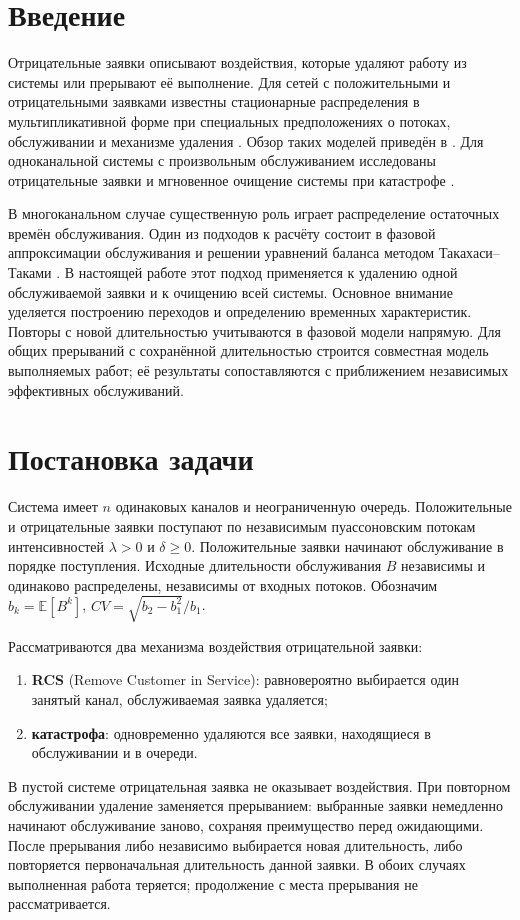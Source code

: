 \section{Введение}
Отрицательные заявки описывают воздействия, которые удаляют работу из системы или прерывают её выполнение. Для сетей с положительными и отрицательными заявками известны стационарные распределения в мультипликативной форме при специальных предположениях о потоках, обслуживании и механизме удаления \cite{gelenbe1991,gelenbe1992}. Обзор таких моделей приведён в \cite{artalejo2000}. Для одноканальной системы с произвольным обслуживанием исследованы отрицательные заявки \cite{harrison1996} и мгновенное очищение системы при катастрофе \cite{jain1996}.

В многоканальном случае существенную роль играет распределение остаточных времён обслуживания. Один из подходов к расчёту состоит в фазовой аппроксимации обслуживания и решении уравнений баланса методом Такахаси--Таками \cite{takahashi1976,ryzhikov2018ru}. В настоящей работе этот подход применяется к удалению одной обслуживаемой заявки и к очищению всей системы. Основное внимание уделяется построению переходов и определению временных характеристик. Повторы с новой длительностью учитываются в фазовой модели напрямую. Для общих прерываний с сохранённой длительностью строится совместная модель выполняемых работ; её результаты сопоставляются с приближением независимых эффективных обслуживаний.

\section{Постановка задачи}
Система имеет \(n\) одинаковых каналов и неограниченную очередь. Положительные и отрицательные заявки поступают по независимым пуассоновским потокам интенсивностей \(\lambda>0\) и \(\delta\ge0\). Положительные заявки начинают обслуживание в порядке поступления. Исходные длительности обслуживания \(B\) независимы и одинаково распределены, независимы от входных потоков. Обозначим \(b_k=\mathbb E[B^k]\), \(CV=\sqrt{b_2-b_1^2}/b_1\).

Рассматриваются два механизма воздействия отрицательной заявки:
\begin{enumerate}[leftmargin=1.5em]
\item \textbf{RCS} (Remove Customer in Service): равновероятно выбирается один занятый канал, обслуживаемая заявка удаляется;
\item \textbf{катастрофа}: одновременно удаляются все заявки, находящиеся в обслуживании и в очереди.
\end{enumerate}
В пустой системе отрицательная заявка не оказывает воздействия. При повторном обслуживании удаление заменяется прерыванием: выбранные заявки немедленно начинают обслуживание заново, сохраняя преимущество перед ожидающими. После прерывания либо независимо выбирается новая длительность, либо повторяется первоначальная длительность данной заявки. В обоих случаях выполненная работа теряется; продолжение с места прерывания не рассматривается.

